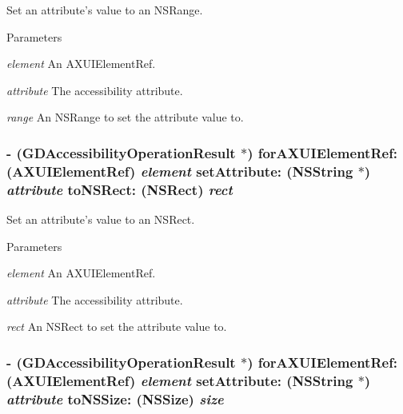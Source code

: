 Set an attribute's value to an NSRange. 
\begin{DoxyParams}{Parameters}
\item[{\em element}]An AXUIElementRef. \item[{\em attribute}]The accessibility attribute. \item[{\em range}]An NSRange to set the attribute value to. \end{DoxyParams}
\hypertarget{interface_g_d_accessibility_manager_acb7c3a3be1de6bdf614a08cc461f5c75}{
\subsubsection[{forAXUIElementRef:setAttribute:toNSRect:}]{\setlength{\rightskip}{0pt plus 5cm}-\/ ({\bf GDAccessibilityOperationResult} $\ast$) forAXUIElementRef: (AXUIElementRef) {\em element}\/ setAttribute: ({\bf NSString} $\ast$) {\em attribute}\/ toNSRect: (NSRect) {\em rect}}}
\label{interface_g_d_accessibility_manager_acb7c3a3be1de6bdf614a08cc461f5c75}


Set an attribute's value to an NSRect. 
\begin{DoxyParams}{Parameters}
\item[{\em element}]An AXUIElementRef. \item[{\em attribute}]The accessibility attribute. \item[{\em rect}]An NSRect to set the attribute value to. \end{DoxyParams}
\hypertarget{interface_g_d_accessibility_manager_a9ebf98303317b2e55a27ca31bef44942}{
\subsubsection[{forAXUIElementRef:setAttribute:toNSSize:}]{\setlength{\rightskip}{0pt plus 5cm}-\/ ({\bf GDAccessibilityOperationResult} $\ast$) forAXUIElementRef: (AXUIElementRef) {\em element}\/ setAttribute: ({\bf NSString} $\ast$) {\em attribute}\/ toNSSize: (NSSize) {\em size}}}
\label{interface_g_d_accessibility_manager_a9ebf98303317b2e55a27ca31bef44942}


